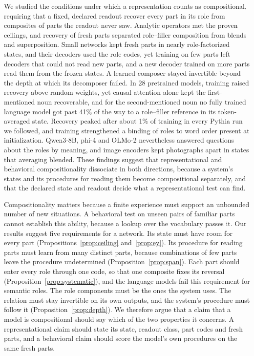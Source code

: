 \documentclass[10pt]{article}
\theoremstyle{plain}
\theoremstyle{remark}
\begin{document}
We studied the conditions under which a representation counts as compositional, requiring that a fixed, declared readout recover every part in its role from composites of parts the readout never saw. Analytic operators met the proven ceilings, and recovery of fresh parts separated role--filler composition from blends and superposition. Small networks kept fresh parts in nearly role-factorized states, and their decoders used the role codes, yet training on few parts left decoders that could not read new parts, and a new decoder trained on more parts read them from the frozen states. A learned composer stayed invertible beyond the depth at which its decomposer failed. In 28 pretrained models, training raised recovery above random weights, yet causal attention alone kept the first-mentioned noun recoverable, and for the second-mentioned noun no fully trained language model got past 41\% of the way to a role--filler reference in its token-averaged state. Recovery peaked after about 1\% of training in every Pythia run we followed, and training strengthened a binding of roles to word order present at initialization. Qwen3-8B, phi-4 and OLMo-2 nevertheless answered questions about the roles by meaning, and image encoders kept photographs apart in states that averaging blended. These findings suggest that representational and behavioral compositionality dissociate in both directions, because a system's states and its procedures for reading them become compositional separately, and that the declared state and readout decide what a representational test can find.

Compositionality matters because a finite experience must support an unbounded number of new situations. A behavioral test on unseen pairs of familiar parts cannot establish this ability, because a lookup over the vocabulary passes it. Our results suggest five requirements for a network. Its state must have room for every part (Propositions~\ref{prop:ceiling} and~\ref{prop:ey}). Its procedure for reading parts must learn from many distinct parts, because combinations of few parts leave the procedure undetermined (Proposition~\ref{prop:span}). Each part should enter every role through one code, so that one composite fixes its reversal (Proposition~\ref{prop:systematic}), and the language models fail this requirement for semantic roles. The role components must be the ones the system uses. The relation must stay invertible on its own outputs, and the system's procedure must follow it (Proposition~\ref{prop:depth}). We therefore argue that a claim that a model is compositional should say which of the two properties it concerns. A representational claim should state its state, readout class, part codes and fresh parts, and a behavioral claim should score the model's own procedures on the same fresh parts.
\end{document}
